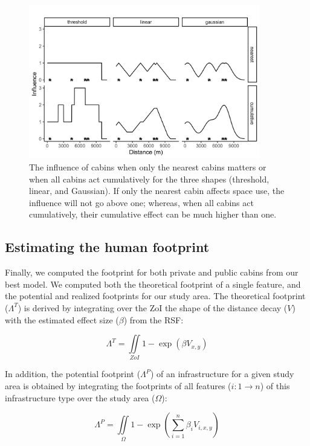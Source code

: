 \documentclass{article}
\begin{document}
\begin{figure}
\centering
\includegraphics[width=0.9\textwidth]{figures/ZoI_density.jpg}
\caption{\label{fig:ZoI_density} The influence of cabins when only the nearest cabins matters or when all cabins act cumulatively for the three shapes (threshold, linear, and Gaussian). If only the nearest cabin affects space use, the influence will not go above one; whereas, when all cabins act cumulatively, their cumulative effect can be much higher than one.}
\end{figure}

\subsection{Estimating the human footprint}

Finally, we computed the footprint for both private and public cabins from our best model. We computed both the theoretical footprint of a single feature, and the potential and realized footprints for our study area. The theoretical footprint ($\Lambda^T$) is derived by integrating over the ZoI the shape of the distance decay ($V$) with the estimated effect size ($\beta$) from the RSF:

\begin{equation}
    \Lambda^T = \iint\limits_{ZoI} 1-\exp(\beta V_{x,y})
\end{equation}

In addition, the potential footprint ($\Lambda^P$) of an infrastructure for a given study area is obtained by integrating the footprints of all features ($i: 1 \rightarrow n$) of this infrastructure type over the study area ($\Omega$):

\begin{equation}
    \Lambda^P = \iint\limits_{\Omega} 1-\exp(\sum_{i=1}^n \beta_i V_{i,x,y})
\end{equation}
\end{document}
